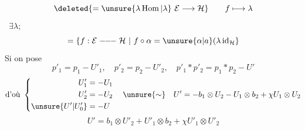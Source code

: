 \[
\deleted{=\unsure{\lambda\operatorname{Hom}|\lambda}\ \mathcal E\longrightarrow\mathcal H}
\qquad f\longmapsto\lambda
\]
\ \(\exists\lambda;\)
\[
=\left\{f:\mathcal E\mathrel{-\!\!-\!\!-}\mathcal H\ \middle|\ 
f\circ\alpha=\unsure{\alpha|a}(\lambda\,\mathrm{id}_{\mathcal H}\right\}
\]
Si on pose
\[
p'_1=p_1-U'_1,\quad p'_2=p_2-U'_2,\quad
p'_1*p'_2=p_1*p_2-U'
\]
\[
\text{d'où }\left\{\begin{aligned}
U'_1&=-U_1\\
U'_2&=-U_2\\
\unsure{U'|U'_0}&=-U
\end{aligned}\right.
\quad\unsure{\sim}\quad
U'=-b_1\otimes U_2-U_1\otimes b_2+\chi U_1\otimes U_2
\]
\[
\boxed{U'=b_1\otimes U'_2+U'_1\otimes b_2+\chi U'_1\otimes U'_2}
\]
